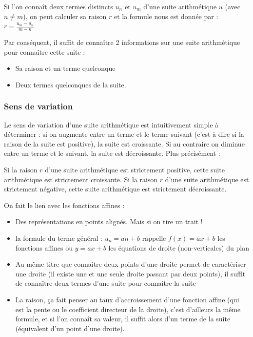 \documentclass[10pt,a4paper]{book}
\begin{document}
\begin{prop}
    Si l'on connaît deux termes distincts $u_n$ et $u_m$ d'une suite arithmétique $u$ (avec $n \neq m$), on peut calculer sa raison $r$ et la formule nous est donnée par : $r = \frac{u_m-u_n}{m-n}$
\end{prop}

Par conséquent, il suffit de connaître 2 informations sur une suite arithmétique pour connaître cette suite :
\begin{itemize}
    \item Sa raison et un terme quelconque
    \item Deux termes quelconques de la suite.
\end{itemize}

\subsubsection{Sens de variation}

Le sens de variation d'une suite arithmétique est intuitivement simple à déterminer : si on augmente entre un terme et le terme suivant (c'est à dire si la raison de la suite est positive), la suite est croissante. Si au contraire on diminue entre un terme et le suivant, la suite est décroissante. Plus précisément :

\begin{prop}
    Si la raison $r$ d'une suite arithmétique est strictement positive, cette suite arithmétique est strictement croissante.
    Si la raison $r$ d'une suite arithmétique est strictement négative, cette suite arithmétique est strictement décroissante.
\end{prop}


On fait le lien avec les fonctions affines : 
\begin{itemize}
    \item Des représentations en points alignés. Mais si on tire un trait ! 
    \item la formule du terme général : $u_n=an+b$ rappelle $f(x)=ax+b$ les fonctions affines ou $y=ax+b$ les équations de droite (non-verticales) du plan
    \item Au même titre que connaître deux points d'une droite permet de caractériser une droite (il existe une et une seule droite passant par deux points), il suffit de connaître deux termes d'une suite pour connaître la suite
    \item La raison, ça fait penser au taux d'accroissement d'une fonction affine (qui est la pente ou le coefficient directeur de la droite), c'est d'ailleurs la même formule, et si l'on connaît sa valeur, il suffit alors d'un terme de la suite (équivalent d'un point d'une droite).
\end{itemize}
\end{document}
